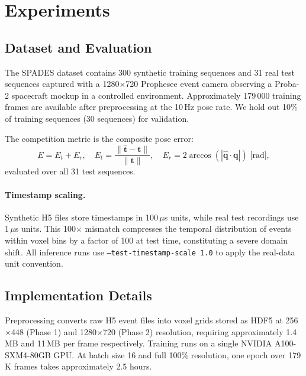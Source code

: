 \documentclass[10pt,twocolumn,letterpaper]{article}
\begin{document}
\section{Experiments}
\label{sec:experiments}

\subsection{Dataset and Evaluation}
\label{sec:dataset}

The SPADES dataset \cite{spades2024} contains 300 synthetic training
sequences and 31 real test sequences captured with a 1280$\times$720
Prophesee event camera observing a Proba-2 spacecraft mockup in a
controlled environment.  Approximately 179\,000 training frames are
available after preprocessing at the 10\,Hz pose rate.
We hold out 10\% of training sequences (30 sequences) for validation.

The competition metric is the composite pose error:
\begin{equation}
  E = E_t + E_r, \quad
  E_t = \frac{\|\hat{\mathbf{t}} - \mathbf{t}\|}{\|\mathbf{t}\|}, \quad
  E_r = 2\arccos(|\hat{\mathbf{q}} \cdot \mathbf{q}|)\;\text{[rad]},
\end{equation}
evaluated over all 31 test sequences.

\paragraph{Timestamp scaling.}
Synthetic H5 files store timestamps in 100\,$\mu$s units, while real
test recordings use 1\,$\mu$s units.  This 100$\times$ mismatch
compresses the temporal distribution of events within voxel bins by a
factor of 100 at test time, constituting a severe domain shift.
All inference runs use \texttt{--test-timestamp-scale~1.0} to apply the
real-data unit convention.

\subsection{Implementation Details}

Preprocessing converts raw H5 event files into voxel grids stored as
HDF5 at 256$\times$448 (Phase 1) and 1280$\times$720 (Phase 2)
resolution, requiring approximately 1.4\,MB and 11\,MB per frame
respectively.  Training runs on a single NVIDIA A100-SXM4-80GB GPU.
At batch size 16 and full 100\% resolution, one epoch over 179\,K
frames takes approximately 2.5 hours.
\end{document}
